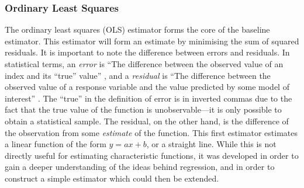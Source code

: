 \documentclass[a4paper,11pt]{article}
\begin{document}
\subsubsection{Ordinary Least Squares}
\label{sec-5-1-1}

The ordinary least squares (OLS) estimator forms the core of the baseline
estimator. This estimator will form an estimate by minimising the sum of squared
residuals. It is important to note the difference between errors and
residuals. In statistical terms, an \emph{error} is ``The difference between the
observed value of an index and its ``true'' value'' \cite{2008oecd}, and a
\emph{residual} is ``The difference between the observed value of a response
variable and the value predicted by some model of interest''
\cite{everitt2010cambridge}. The ``true'' in the definition of error is in
inverted commas due to the fact that the true value of the function is
unobservable---it is only possible to obtain a statistical sample. The residual,
on the other hand, is the difference of the observation from some
\emph{estimate} of the function. This first estimator estimates a linear
function of the form $y=ax+b$, or a straight line. While this is not directly
useful for estimating characteristic functions, it was developed in order to
gain a deeper understanding of the ideas behind regression, and in order to
construct a simple estimator which could then be extended.
\end{document}
